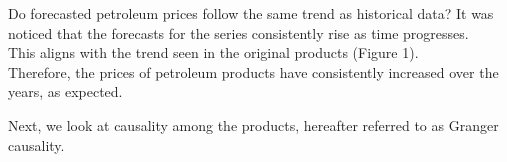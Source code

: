\documentclass{beamer}
\newcommand{\vspaceFive}{\vspace{5pt}}
\newcommand{\vspaceTen}{\vspace{10pt}}
\begin{document}
	\begin{frame}
		\begin{exampleblock}{ \vspaceFive Do forecasted petroleum prices follow the same trend as historical data? \vspaceFive}
			It was noticed that the forecasts for the series consistently rise as time progresses. \\
			This aligns with the trend seen in the original products (Figure 1). \\ Therefore, the prices of petroleum products have consistently increased over the years, as expected. \vspaceFive
		\end{exampleblock} \vspaceTen
	
		\begin{exampleblock}{}
			Next, we look at causality among the products, hereafter referred to as
			Granger causality.
		\end{exampleblock}
	\end{frame}
	
	
	
	
	
	
\end{document}
